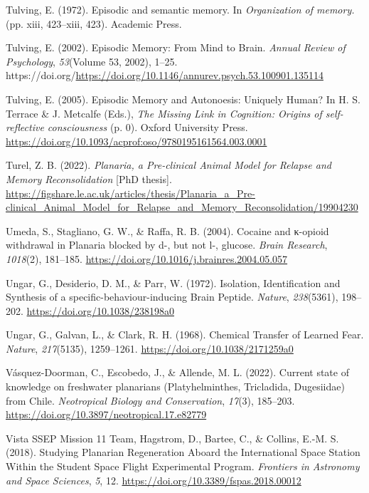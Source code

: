 \documentclass[
  jou,
  floatsintext,
  longtable,
  nolmodern,
  notxfonts,
  notimes,
  donotrepeattitle,
  colorlinks=true,linkcolor=blue,citecolor=blue,urlcolor=blue]{apa7}
\newlength{\cslhangindent}
\newenvironment{CSLReferences}[2] %
 {\begin{list}{}{%
  \setlength{\itemindent}{0pt}
  \setlength{\leftmargin}{0pt}
  \setlength{\parsep}{0pt}
  \ifodd #1
   \setlength{\leftmargin}{\cslhangindent}
   \setlength{\itemindent}{-1\cslhangindent}
  \fi
  \setlength{\itemsep}{#2\baselineskip}}}
 {\end{list}}
\begin{document}
\begin{CSLReferences}{1}{0}
Tulving, E. (1972). Episodic and semantic memory. In \emph{Organization
of memory.} (pp. xiii, 423--xiii, 423). Academic Press.

Tulving, E. (2002). Episodic {Memory}: {From} {Mind} to {Brain}.
\emph{Annual Review of Psychology}, \emph{53}(Volume 53, 2002), 1--25.
https://doi.org/\url{https://doi.org/10.1146/annurev.psych.53.100901.135114}

Tulving, E. (2005). Episodic {Memory} and {Autonoesis}: {Uniquely}
{Human}? In H. S. Terrace \& J. Metcalfe (Eds.), \emph{The {Missing}
{Link} in {Cognition}: {Origins} of self-reflective consciousness} (p.
0). Oxford University Press.
\url{https://doi.org/10.1093/acprof:oso/9780195161564.003.0001}

Turel, Z. B. (2022). \emph{Planaria, a {Pre}-clinical {Animal} {Model}
for {Relapse} and {Memory} {Reconsolidation}} {[}PhD thesis{]}.
\url{https://figshare.le.ac.uk/articles/thesis/Planaria_a_Pre-clinical_Animal_Model_for_Relapse_and_Memory_Reconsolidation/19904230}

Umeda, S., Stagliano, G. W., \& Raffa, R. B. (2004). Cocaine and
κ-opioid withdrawal in {Planaria} blocked by d-, but not l-, glucose.
\emph{Brain Research}, \emph{1018}(2), 181--185.
\url{https://doi.org/10.1016/j.brainres.2004.05.057}

Ungar, G., Desiderio, D. M., \& Parr, W. (1972). Isolation,
{Identification} and {Synthesis} of a specific-behaviour-inducing
{Brain} {Peptide}. \emph{Nature}, \emph{238}(5361), 198--202.
\url{https://doi.org/10.1038/238198a0}

Ungar, G., Galvan, L., \& Clark, R. H. (1968). Chemical {Transfer} of
{Learned} {Fear}. \emph{Nature}, \emph{217}(5135), 1259--1261.
\url{https://doi.org/10.1038/2171259a0}

Vásquez-Doorman, C., Escobedo, J., \& Allende, M. L. (2022). Current
state of knowledge on freshwater planarians ({Platyhelminthes},
{Tricladida}, {Dugesiidae}) from {Chile}. \emph{Neotropical Biology and
Conservation}, \emph{17}(3), 185--203.
\url{https://doi.org/10.3897/neotropical.17.e82779}

Vista SSEP Mission 11 Team, Hagstrom, D., Bartee, C., \& Collins, E.-M.
S. (2018). Studying {Planarian} {Regeneration} {Aboard} the
{International} {Space} {Station} {Within} the {Student} {Space}
{Flight} {Experimental} {Program}. \emph{Frontiers in Astronomy and
Space Sciences}, \emph{5}, 12.
\url{https://doi.org/10.3389/fspas.2018.00012}


\end{CSLReferences}
\end{document}
